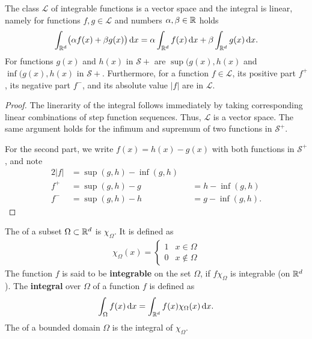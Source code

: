 \begin{theorem}
  \label{theorem:integral:linearity}
  The class $\mathcal L$ of integrable functions is a vector space and
  the integral is linear, namely for functions $f,g\in \mathcal L$ and
  numbers $\alpha,\beta\in \mathbb R$ holds
  \begin{gather}
    \label{eq:integral:3}
    \int_{\mathbb R^d} \bigl(\alpha f(x)+\beta g(x) \bigr)\,\mathrm{d} x
    =\alpha \int_{\mathbb R^d} f(x)\,\mathrm{d} x
    +\beta\int_{\mathbb R^d} g(x)\,\mathrm{d} x.
  \end{gather}
  For functions $g(x)$ and $h(x)$ in $\mathcal S+$ are
  $\sup(g(x),h(x)$ and  $\inf(g(x),h(x)$ in $\mathcal S+$.
  Furthermore, for a function $f\in \mathcal L$, its positive part
  $f^+$, its negative part $f^-$, and its absolute value $|f|$ are in
  $\mathcal L$.
\end{theorem}

\begin{proof}
  The linerarity of the integral follows immediately by taking
  corresponding linear combinations of step function sequences. Thus,
  $\mathcal L$ is a vector space. The same argument holds for the
  infimum and supremum of two functions in $\mathcal S^+$.

  For the second part, we write $f(x)=h(x)-g(x)$ with both functions
  in $\mathcal S^+$, and note
  \begin{alignat*}{2}
    |f| &= \sup(g,h) - \inf(g,h) \\
    f^+ &= \sup(g,h) - g &&= h - \inf(g,h) \\
    f^- &= \sup(g,h) - h &&= g - \inf(g,h).
  \end{alignat*}
\end{proof}

\begin{definition}
  The  of a subset $\Omega\subset\mathbb R^d$ is
  $\chi_{\Omega}$. It is defined as
  \begin{gather*}
    \chi_{\Omega}(x) =
    \begin{cases}
      1 & x\in \Omega \\
      0 & x\not\in \Omega
    \end{cases}
  \end{gather*}
  The function $f$ is said to be \textbf{integrable} on the set
  $\Omega$, if $f\chi_\Omega$ is integrable (on $\mathbb R^d$). The
  \textbf{integral} over $\Omega$ of a function $f$ is defined as
  \begin{gather*}
    \int_\Omega f(x)\,\mathrm{d} x = \int_{\mathbb R^d} f(x) \chi_\Omega(x)\,\mathrm{d} x.
  \end{gather*}
  The  of a bounded domain $\Omega$ is the integral of
  $\chi_\Omega$.
\end{definition}

